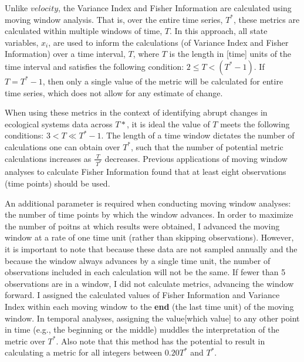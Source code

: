 \documentclass[print]{nuthesis}
\begin{document}
Unlike \(velocity\), the Variance Index and Fisher Information are calculated using moving window analysis. That is, over the entire time series, \(T^*\), these metrics are calculated within multiple windows of time, \(T\). In this approach, all state variables, \(x_i\), are used to inform the calculations (of Variance Index and Fisher Information) over a time interval, \(T\), where \(T\) is the length in {[}time{]} units of the time interval and satisfies the following condition: \(2\leq T < (T^*-1)\). If \(T = T^*-1\), then only a single value of the metric will be calculated for entire time series, which does not allow for any estimate of change.

When using these metrics in the context of identifying abrupt changes in ecological systems data across \(T*\), it is ideal the value of \(T\) meets the following conditions: \(3 < T \ll T^*-1\). The length of a time window dictates the number of calculations one can obtain over \(T^*\), such that the number of potential metric calculations increases as \(\frac{T}{\ T^*}\) decreases. Previous applications of moving window analyses to calculate Fisher Information found that at least eight observations (time points) should be used.

An additional parameter is required when conducting moving window analyses: the number of time points by which the window advances. In order to maximize the number of poitns at which results were obtained, I advanced the moving window at a rate of one time unit (rather than skipping observations). However, it is important to note that because these data are not sampled annually and the because the window always advances by a single time unit, the number of observations included in each calculation will not be the same. If fewer than 5 observations are in a window, I did not calculate metrics, advancing the window forward. I assigned the calculated values of Fisher Information and Variance Index within each moving window to the \textbf{end} (the last time unit) of the moving window. In temporal analyses, assigning the value{[}which value{]} to any other point in time (e.g., the beginning or the middle) muddles the interpretation of the metric over \(T^*\). Also note that this method has the potential to result in calculating a metric for all integers between \(0.20 T^*\) and \(T^*\).
\end{document}
